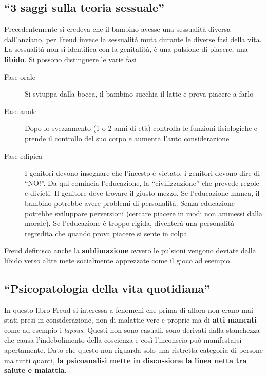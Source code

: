 \subsection{``3 saggi sulla teoria sessuale''}
Precedentemente si credeva che il bambino avesse una sessualità diversa dall'anziano, per Freud 
invece la sessualità muta durante le diverse fasi della vita. La sessualità non si identifica con la
genitalità, è una pulsione di piacere, una \textbf{libido}. Si possono distinguere le varie fasi
\begin{description}
  \item[Fase orale] Si sviuppa dalla bocca, il bambino succhia il latte e prova piacere a farlo
  \item[Fase anale] Dopo lo svezzamento (1 o 2 anni di età) controlla le funzioni fisiologiche e
    prende il controllo del suo corpo e aumenta l'auto considerazione
  \item[Fase edipica] I genitori devono insegnare che l'incesto è vietato, i genitori devono dire di
    ``NO!''. Da qui comincia l'educazione, la ``civilizzazione'' che prevede regole e divieti. Il
    genitore deve trovare il giusto mezzo. Se l'educazione manca, il bambino potrebbe avere problemi
    di personalità. Senza educazione potrebbe sviluppare perversioni (cercare piacere in modi non
    ammessi dalla morale). Se l'educazione è troppo rigida, diventerà una personalità regredita che
    quando prova piacere si sente in colpa
\end{description}
Freud definisca anche la \textbf{sublimazione} ovvero le pulsioni vengono deviate dalla libido verso
altre mete socialmente apprezzate come il gioco ad esempio.

\subsection{``Psicopatologia della vita quotidiana''}
In questo libro Freud si interessa a fenomeni che prima di allora non erano mai stati presi in 
considerazione, non di malattie vere e proprie ma di \textbf{atti mancati} come ad esempio i
\textit{lapsus}. Questi non sono casuali, sono derivati dalla stanchezza che causa l'indebolimento
della coscienza e così l'inconscio può manifestarsi apertamente. Dato che questo non riguarda solo
una ristretta categoria di persone ma tutti quanti, \textbf{la psicoanalisi mette in discussione la
linea netta tra salute e malattia}. 

